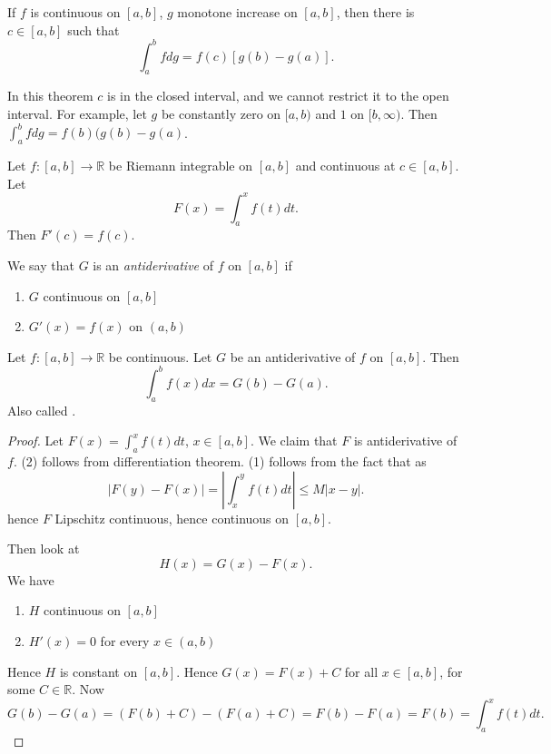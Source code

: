
\begin{theorem}
	If $f$ is continuous on $[a,b]$, $g$ monotone increase on $[a,b]$, then there is $c \in [a,b]$ such that 
	\[
		\int_a^b f dg = f(c) \left[ g(b) - g(a) \right] 
	.\]
\end{theorem}
\begin{remark}
	In this theorem $c$ is in the closed interval, and we cannot restrict it to the open interval. For example, let $g$ be constantly zero on $[a,b)$ and $1$ on $[b, \infty )$. Then $\int_a^b f dg = f(b) (g(b) - g(a)$.
\end{remark}

\begin{theorem}
	Let $f:[a,b] \to \mathbb{R}$ be Riemann integrable on $[a,b]$ and continuous at $c \in [a,b]$. Let
	\[
		F(x) = \int_a^x f(t)dt
	.\] 
Then $F'(c) = f(c)$.
\end{theorem}
\begin{definition}[Antiderivative]
	We say that $G$ is an \textit{antiderivative} of $f$ on $[a,b]$ if
	\begin{enumerate}
		\item $G$ continuous on $[a,b]$ 
		\item $G'(x) = f(x)$ on $(a,b)$
	\end{enumerate}
\end{definition}

\begin{corollary}
	Let $f: [a,b] \to \mathbb{R}$ be continuous.
	Let $G$ be an antiderivative of $f$ on $[a,b]$.
	Then
	\[
		\int_a^b f(x) dx = G(b) - G(a)
	.\] 
	Also called .
\end{corollary}
\begin{proof}
	Let $F(x) = \int_a^x f(t) dt$, $x \in [a,b]$.
	We claim that $F$ is antiderivative of $f$.
	(2) follows from differentiation theorem. (1) follows from the fact that as
	\[
		|F(y) - F(x)| = \left|\int_x^y f(t) dt\right| \le M |x-y|
	.\]
	hence $F$ Lipschitz continuous, hence continuous on $[a,b]$.

	Then look at \[
		H(x) = G(x) - F(x)
	.\] 
	We have
	\begin{enumerate}
		\item $H$ continuous on $[a,b]$
		\item  $H'(x) = 0$ for every  $x \in (a,b)$
	\end{enumerate}
	Hence $H$ is constant on $[a,b]$. Hence  $G(x) = F(x) + C$ for all $x \in [a,b]$, for some $C \in \mathbb{R}$. Now
	\[
		G(b) - G(a) = (F(b) + C) - (F(a)+C) = F(b) - F(a) = F(b) = \int_a^x f(t) dt
	.\] 

\end{proof}

